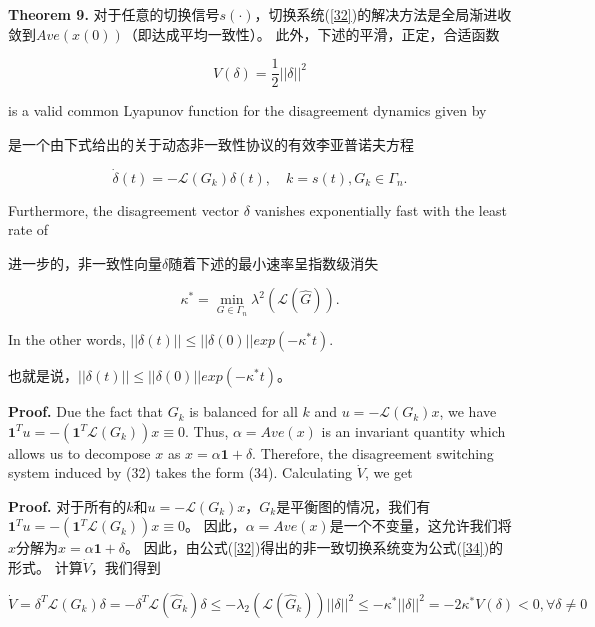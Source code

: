\documentclass{article}
\begin{document}
\noindent \textbf{Theorem 9.} 对于任意的切换信号$s(\cdot)$，切换系统(\ref{32})的解决方法是全局渐进收敛到$Ave(x(0))$（即达成平均一致性）。
此外，下述的平滑，正定，合适函数

\begin{equation}
    V(\delta) = \frac{1}{2}||\delta||^2
    \label{33}
    \tag{33}
\end{equation}

{\color[gray]{0.5}
\noindent is a valid common Lyapunov function for the disagreement dynamics given by
}

\noindent 是一个由下式给出的关于动态非一致性协议的有效李亚普诺夫方程

\begin{equation}
    \dot{\delta}(t) = -\mathcal{L}(G_k)\delta(t),\quad k=s(t),G_k\in \Gamma_n.
    \tag{34}
    \label{34}
\end{equation}

{\color[gray]{0.5}
\noindent Furthermore, the disagreement vector $\delta$ vanishes exponentially fast with the least rate of
}

\noindent 进一步的，非一致性向量$\delta$随着下述的最小速率呈指数级消失

\begin{equation}
    \kappa^* = \min_{G\in \Gamma_n} \lambda^2(\mathcal{L}(\hat{G})).
    \tag{35}
    \label{35}
\end{equation}

{\color[gray]{0.5}
\noindent In the other words, $||\delta(t)||\le ||\delta(0)||exp(-\kappa^*t)$.
}

\noindent 也就是说，$||\delta(t)||\le ||\delta(0)||exp(-\kappa^*t)$。

{\color[gray]{0.5}
\noindent \textbf{Proof.} Due the fact that $G_k$ is balanced for all $k$ and $u=-\mathcal{L}(G_k)x$, we have $\mathbf{1}^Tu=-(\mathbf{1}^T\mathcal{L}(G_k))x\equiv0$. 
Thus, $\alpha=Ave(x)$ is an invariant quantity which allows us to decompose $x$ as $x=\alpha \mathbf{1}+\delta$.
Therefore, the disagreement switching system induced by (32) takes the form (34). 
Calculating $\dot{V}$, we get
}

\noindent \textbf{Proof.}
对于所有的$k$和$u=-\mathcal{L}(G_k)x$，$G_k$是平衡图的情况，我们有$\mathbf{1}^Tu=-(\mathbf{1}^T\mathcal{L}(G_k))x\equiv0$。
因此，$\alpha=Ave(x)$是一个不变量，这允许我们将$x$分解为$x=\alpha \mathbf{1}+\delta$。
因此，由公式(\ref{32})得出的非一致切换系统变为公式(\ref{34})的形式。
计算$\dot{V}$，我们得到

\begin{equation}
    \tag{36}
    \label{36}
    \dot{V} = \delta^T\mathcal{L}(G_k)\delta = -\delta^T\mathcal{L}(\hat{G}_k)\delta \le -\lambda_2(\mathcal{L}(\hat{G}_k))||\delta||^2 \le -\kappa^*||\delta||^2 = -2\kappa^*V(\delta)<0,\forall \delta \ne 0
\end{equation}
\end{document}
